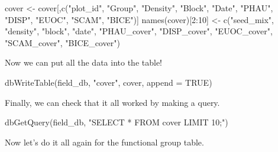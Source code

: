 \documentclass[
]{book}
\newenvironment{Shaded}{\begin{snugshade}}{\end{snugshade}}
\newcommand{\AttributeTok}[1]{\textcolor[rgb]{0.77,0.63,0.00}{#1}}
\newcommand{\ConstantTok}[1]{\textcolor[rgb]{0.00,0.00,0.00}{#1}}
\newcommand{\DecValTok}[1]{\textcolor[rgb]{0.00,0.00,0.81}{#1}}
\newcommand{\FunctionTok}[1]{\textcolor[rgb]{0.00,0.00,0.00}{#1}}
\newcommand{\NormalTok}[1]{#1}
\newcommand{\OtherTok}[1]{\textcolor[rgb]{0.56,0.35,0.01}{#1}}
\newcommand{\SpecialCharTok}[1]{\textcolor[rgb]{0.00,0.00,0.00}{#1}}
\newcommand{\StringTok}[1]{\textcolor[rgb]{0.31,0.60,0.02}{#1}}
\begin{document}
\begin{Shaded}
\begin{Highlighting}[]
\NormalTok{cover }\OtherTok{\textless{}{-}}\NormalTok{ cover[,}\FunctionTok{c}\NormalTok{(}\StringTok{"plot\_id"}\NormalTok{, }\StringTok{"Group"}\NormalTok{, }\StringTok{"Density"}\NormalTok{, }\StringTok{"Block"}\NormalTok{, }
                  \StringTok{"Date"}\NormalTok{, }\StringTok{"PHAU"}\NormalTok{, }\StringTok{"DISP"}\NormalTok{, }\StringTok{"EUOC"}\NormalTok{, }\StringTok{"SCAM"}\NormalTok{, }\StringTok{"BICE"}\NormalTok{)]}
\FunctionTok{names}\NormalTok{(cover)[}\DecValTok{2}\SpecialCharTok{:}\DecValTok{10}\NormalTok{] }\OtherTok{\textless{}{-}} \FunctionTok{c}\NormalTok{(}\StringTok{"seed\_mix"}\NormalTok{, }\StringTok{"density"}\NormalTok{, }\StringTok{"block"}\NormalTok{, }\StringTok{"date"}\NormalTok{, }
                       \StringTok{"PHAU\_cover"}\NormalTok{, }\StringTok{"DISP\_cover"}\NormalTok{, }\StringTok{"EUOC\_cover"}\NormalTok{, }
                       \StringTok{"SCAM\_cover"}\NormalTok{, }\StringTok{"BICE\_cover"}\NormalTok{)}
\end{Highlighting}
\end{Shaded}

Now we can put all the data into the table!

\begin{Shaded}
\begin{Highlighting}[]
\FunctionTok{dbWriteTable}\NormalTok{(field\_db, }\StringTok{"cover"}\NormalTok{, cover, }\AttributeTok{append =} \ConstantTok{TRUE}\NormalTok{)}
\end{Highlighting}
\end{Shaded}

Finally, we can check that it all worked by making a query.

\begin{Shaded}
\begin{Highlighting}[]
\FunctionTok{dbGetQuery}\NormalTok{(field\_db, }\StringTok{"SELECT * FROM cover LIMIT 10;"}\NormalTok{)}
\end{Highlighting}
\end{Shaded}

Now let's do it all again for the functional group table.
\end{document}
